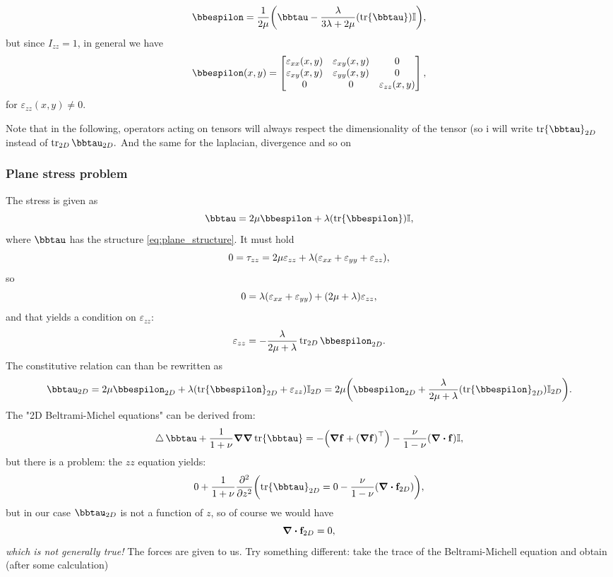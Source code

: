 \documentclass[../main.tex]{subfiles}
\begin{document}
\[
	\bbespilon = \frac{1}{2 \mu}\qty(\bbtau-\frac{\lambda}{3 \lambda+2 \mu}\qty(\tr \bbtau)\identity),
\]
but since $I_{zz} = 1$, in general we have
\[
	\bbespilon\qty(x,y)=\begin{bmatrix}
		\varepsilon_{xx}\qty(x,y) & \varepsilon_{xy}\qty(x,y) & 0 \\
		\varepsilon_{xy}\qty(x,y) & \varepsilon_{yy}\qty(x,y) & 0 \\
		0 & 0 & \varepsilon_{zz}(x,y)
	\end{bmatrix},
\]
for $\varepsilon_{zz}(x,y) \neq 0$.

\begin{remark}[Notation]
Note that in the following, operators acting on tensors will always respect the dimensionality of the tensor (so i will write $\tr \bbtau_{2D}$ instead of $\tr_{2D} \bbtau_{2D}.$ And the same for the laplacian, divergence and so on
\end{remark}

\subsubsection{Plane stress problem}
\label{sec:plane_stress_problem}

The stress is given as
\[
	\bbtau = 2 \mu \bbespilon + \lambda \qty(\tr \bbespilon)\identity,
\]
where $\bbtau$ has the structure \ref{eq:plane_structure}. It must hold
\[
	0 = \tau_{zz} = 2 \mu \varepsilon_{zz}+\lambda\qty(\varepsilon_{xx}+\varepsilon_{yy}+\varepsilon_{zz}),
\]
so 
\[
	0 = \lambda\qty(\varepsilon_{xx}+ \varepsilon_{yy})+\qty(2 \mu + \lambda)\varepsilon_{zz},
\]
and that yields a condition on $\varepsilon_{zz}$:
\[
	\varepsilon_{zz} = -\frac{\lambda}{2 \mu+ \lambda} \tr_{2D}\bbespilon_{2D}.
\]
The constitutive relation can than be rewritten as
\[
	\bbtau_{2D} = 2 \mu \bbespilon_{2D}+ \lambda \qty(\tr \bbespilon_{2D}+\varepsilon_{zz})\identity_{2D} = 2 \mu\qty(\bbespilon_{2D}+\frac{\lambda}{2 \mu+\lambda}\qty(\tr \bbespilon_{2D})\identity_{2D}).
\]
The "2D Beltrami-Michel equations" can be derived from:
\[
	\laplace \bbtau+\frac{1}{1+\nu} \grad \grad \tr \bbtau = -\qty(\grad \vb{f} +\transpose{\qty(\grad \vb{f})}) - \frac{\nu}{1-\nu} \qty(\divergence{\vb{f}})\identity,
\]
but there is a problem: the $zz$ equation yields: 
\[
	0 + \frac{1}{1+\nu}\pdv[2]{z}\qty(\tr \bbtau_{2D} = 0 - \frac{\nu}{1- \nu}\qty(\divergence{\vb{f}_{2D}})),
\]
but in our case $\bbtau_{2D}$ is not a function of $z$, so of course we would have
\[
	\divergence{\vb{f}_{2D}} = 0,
\]
\textit{which is not generally true!} The forces are given to us. Try something different: take the trace of the Beltrami-Michell equation and obtain (after some calculation)
\end{document}

